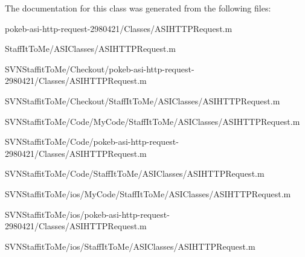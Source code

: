 \-The documentation for this class was generated from the following files\-:\begin{DoxyCompactItemize}
\item 
pokeb-\/asi-\/http-\/request-\/2980421/\-Classes/\-A\-S\-I\-H\-T\-T\-P\-Request.\-m\item 
\-Staff\-It\-To\-Me/\-A\-S\-I\-Classes/\-A\-S\-I\-H\-T\-T\-P\-Request.\-m\item 
\-S\-V\-N\-Staffit\-To\-Me/\-Checkout/pokeb-\/asi-\/http-\/request-\/2980421/\-Classes/\-A\-S\-I\-H\-T\-T\-P\-Request.\-m\item 
\-S\-V\-N\-Staffit\-To\-Me/\-Checkout/\-Staff\-It\-To\-Me/\-A\-S\-I\-Classes/\-A\-S\-I\-H\-T\-T\-P\-Request.\-m\item 
\-S\-V\-N\-Staffit\-To\-Me/\-Code/\-My\-Code/\-Staff\-It\-To\-Me/\-A\-S\-I\-Classes/\-A\-S\-I\-H\-T\-T\-P\-Request.\-m\item 
\-S\-V\-N\-Staffit\-To\-Me/\-Code/pokeb-\/asi-\/http-\/request-\/2980421/\-Classes/\-A\-S\-I\-H\-T\-T\-P\-Request.\-m\item 
\-S\-V\-N\-Staffit\-To\-Me/\-Code/\-Staff\-It\-To\-Me/\-A\-S\-I\-Classes/\-A\-S\-I\-H\-T\-T\-P\-Request.\-m\item 
\-S\-V\-N\-Staffit\-To\-Me/ios/\-My\-Code/\-Staff\-It\-To\-Me/\-A\-S\-I\-Classes/\-A\-S\-I\-H\-T\-T\-P\-Request.\-m\item 
\-S\-V\-N\-Staffit\-To\-Me/ios/pokeb-\/asi-\/http-\/request-\/2980421/\-Classes/\-A\-S\-I\-H\-T\-T\-P\-Request.\-m\item 
\-S\-V\-N\-Staffit\-To\-Me/ios/\-Staff\-It\-To\-Me/\-A\-S\-I\-Classes/\-A\-S\-I\-H\-T\-T\-P\-Request.\-m\end{DoxyCompactItemize}
